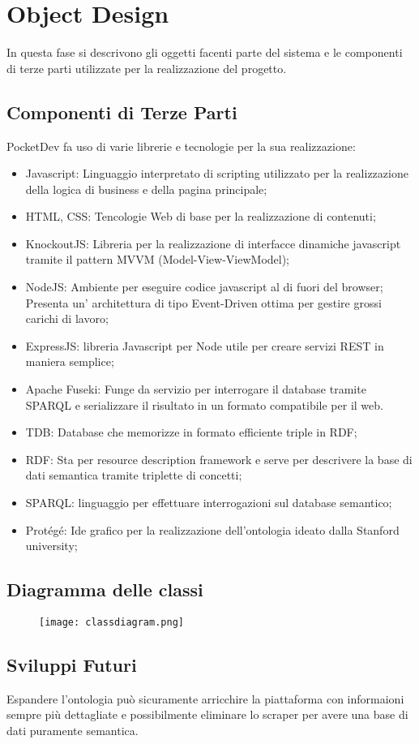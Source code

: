 \section{Object Design}
In questa fase si descrivono gli oggetti facenti parte del sistema e le componenti di terze parti utilizzate per la realizzazione del progetto.
\subsection{Componenti di Terze Parti}
PocketDev fa uso di varie librerie e tecnologie per la sua realizzazione:
\begin{itemize}
 \item Javascript: Linguaggio interpretato di scripting utilizzato per la realizzazione della logica di business e della pagina principale;
 \item HTML, CSS: Tencologie Web di base per la realizzazione di contenuti;
 \item KnockoutJS: Libreria per la realizzazione di interfacce dinamiche javascript tramite il pattern MVVM (Model-View-ViewModel);
 \item NodeJS: Ambiente per eseguire codice javascript al di fuori del browser; Presenta un' architettura di tipo Event-Driven ottima per gestire grossi carichi di lavoro;
 \item ExpressJS: libreria Javascript per Node utile per creare servizi REST in maniera semplice;
 \item Apache Fuseki: Funge da servizio per interrogare il database tramite SPARQL e serializzare il risultato in un formato compatibile per il web.
 \item TDB: Database che memorizze in formato efficiente triple in RDF;
 \item RDF: Sta per resource description framework e serve per descrivere la base di dati semantica tramite triplette di concetti;
 \item SPARQL: linguaggio per effettuare interrogazioni sul database semantico;
 \item Protégé: Ide grafico per la realizzazione dell'ontologia ideato dalla Stanford university;
\end{itemize}
\subsection{Diagramma delle classi}
\begin{figure}[H]
 \texttt{[image: classdiagram.png]}
\end{figure}
\subsection{Sviluppi Futuri}
Espandere l'ontologia può sicuramente arricchire la piattaforma con informaioni sempre più dettagliate e possibilmente eliminare lo scraper per avere una base di dati puramente semantica. 
